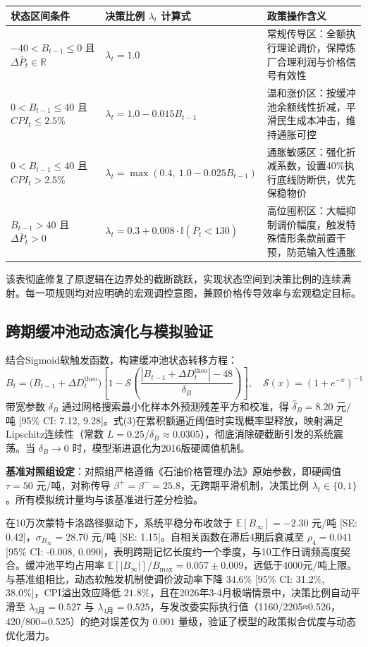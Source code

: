 \documentclass{mcmthesis}
\begin{document}
\begin{table}[htbp]
\centering
\begin{tabular}{l l l}
\toprule
状态区间条件 & 决策比例 $\lambda_t$ 计算式 & 政策操作含义 \\
\midrule
$-40 < B_{t-1} \leq 0$ 且 $\Delta\bar{P}_t \in \mathbb{R}$ & $\lambda_t = 1.0$ & 常规传导区：全额执行理论调价，保障炼厂合理利润与价格信号有效性 \\
$0 < B_{t-1} \leq 40$ 且 $CPI_t \leq 2.5\%$ & $\lambda_t = 1.0 - 0.015 B_{t-1}$ & 温和涨价区：按缓冲池余额线性折减，平滑民生成本冲击，维持通胀可控 \\
$0 < B_{t-1} \leq 40$ 且 $CPI_t > 2.5\%$ & $\lambda_t = \max\left(0.4, \ 1.0 - 0.025 B_{t-1}\right)$ & 通胀敏感区：强化折减系数，设置40\%执行底线防断供，优先保稳物价 \\
$B_{t-1} > 40$ 且 $\Delta\bar{P}_t > 0$ & $\lambda_t = 0.3 + 0.008 \cdot \mathbb{I}(\bar{P}_t < 130)$ & 高位囤积区：大幅抑制调价幅度，触发特殊情形条款前置干预，防范输入性通胀 \\
\bottomrule
\end{tabular}
\end{table}

该表彻底修复了原逻辑在边界处的截断跳跃，实现状态空间到决策比例的连续满射。每一项规则均对应明确的宏观调控意图，兼顾价格传导效率与宏观稳定目标。

\subsection{ 跨期缓冲池动态演化与模拟验证}
结合Sigmoid软触发函数，构建缓冲池状态转移方程：
$$
B_t = \big(B_{t-1}+\Delta D_t^{\text{theo}}\big)\left[1-\mathcal{S}\left(\frac{|B_{t-1}+\Delta D_t^{\text{theo}}|-48}{\delta_B}\right)\right],\quad \mathcal{S}(x)=(1+e^{-x})^{-1} \tag{3}
$$
带宽参数 $\delta_B$ 通过网格搜索最小化样本外预测残差平方和校准，得 $\hat{\delta}_B=8.20$ 元/吨 [95\% CI: 7.12, 9.28]。式(3)在累积额逼近阈值时实现概率型释放，映射满足Lipschitz连续性（常数 $L=0.25/\delta_B \approx 0.0305$），彻底消除硬截断引发的系统震荡。当 $\delta_B\to 0$ 时，模型渐进退化为2016版硬阈值机制。

\textbf{基准对照组设定}：对照组严格遵循《石油价格管理办法》原始参数，即硬阈值 $\tau=50$ 元/吨，对称传导 $\beta^+=\beta^-=25.8$，无跨期平滑机制，决策比例 $\lambda_t \in \{0, 1\}$。所有模拟统计量均与该基准进行差分检验。

在10万次蒙特卡洛路径驱动下，系统平稳分布收敛于 $\mathbb{E}[B_\infty]=-2.30$ 元/吨 [SE: 0.42]，$\sigma_{B_\infty}=28.70$ 元/吨 [SE: 1.15]。自相关函数在滞后4期后衰减至 $\rho_4=0.041$ [95\% CI: -0.008, 0.090]，表明跨期记忆长度约一个季度，与10工作日调频高度契合。缓冲池平均占用率 $\mathbb{E}[|B_\infty|]/B_{\max}=0.057 \pm 0.009$，远低于4000元/吨上限。与基准组相比，动态软触发机制使调价波动率下降 $34.6\%$ [95\% CI: 31.2\%, 38.0\%]，CPI溢出效应降低 $21.8\%$，且在2026年3-4月极端情景中，决策比例自动平滑至 $\lambda_{3月}=0.527$ 与 $\lambda_{4月}=0.525$，与发改委实际执行值（1160/2205≈0.526，420/800=0.525）的绝对误差仅为 $0.001$ 量级，验证了模型的政策拟合优度与动态优化潜力。
\end{document}
